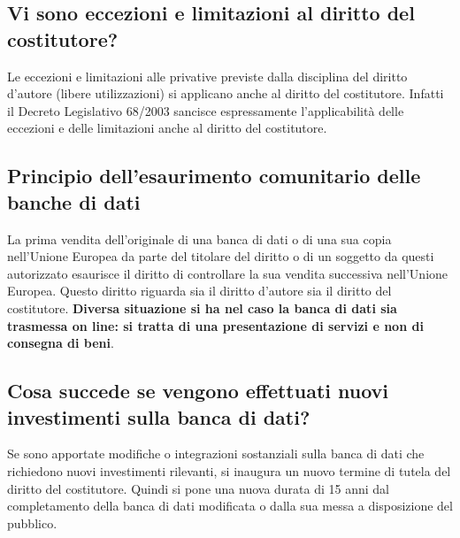 \subsection{Vi sono eccezioni e limitazioni al diritto del costitutore?}
Le eccezioni e limitazioni alle privative previste dalla disciplina del diritto d'autore (libere utilizzazioni) si
applicano anche al diritto del costitutore. Infatti il Decreto Legislativo 68/2003 sancisce espressamente
l'applicabilità delle eccezioni e delle limitazioni anche al diritto del costitutore.

\subsection{Principio dell'esaurimento comunitario delle banche di dati}
La prima vendita dell'originale di una banca di dati o di una sua copia nell'Unione Europea da parte del titolare
del diritto o di un soggetto da questi autorizzato esaurisce il diritto di controllare la sua vendita successiva
nell'Unione Europea. Questo diritto riguarda sia il diritto d'autore sia il diritto del costitutore. \newline
\textbf{Diversa situazione si ha nel caso la banca di dati sia trasmessa on line: si tratta di una presentazione di servizi e
non di consegna di beni}.

\subsection{Cosa succede se vengono effettuati nuovi investimenti sulla banca di dati?}
Se sono apportate modifiche o integrazioni sostanziali sulla banca di dati che richiedono nuovi investimenti
rilevanti, si inaugura un nuovo termine di tutela del diritto del costitutore. Quindi si pone una nuova durata di
15 anni dal completamento della banca di dati modificata o dalla sua messa a disposizione del pubblico.

